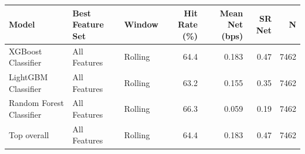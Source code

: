 \begin{tabular}{lllrrrr}
\toprule
Model & Best Feature Set & Window & Hit Rate (\%) & Mean Net (bps) & SR Net & N \\
\midrule
XGBoost Classifier & All Features & Rolling & 64.4 & 0.183 & 0.47 & 7462 \\
LightGBM Classifier & All Features & Rolling & 63.2 & 0.155 & 0.35 & 7462 \\
Random Forest Classifier & All Features & Rolling & 66.3 & 0.059 & 0.19 & 7462 \\
\midrule
Top overall & All Features & Rolling & 64.4 & 0.183 & 0.47 & 7462 \\
\bottomrule
\end{tabular}

